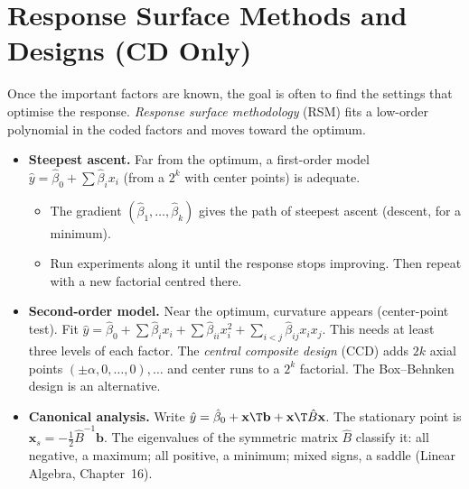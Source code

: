 \section{Response Surface Methods and Designs (CD Only)}

Once the important factors are known, the goal is often to find the settings that optimise the response. \emph{Response surface methodology} (RSM) fits a low-order polynomial in the coded factors and moves toward the optimum.

\begin{itemize}
  \item \textbf{Steepest ascent.} Far from the optimum, a first-order model $\hat{y}=\hat\beta_0+\sum\hat\beta_ix_i$ (from a $2^k$ with center points) is adequate.
  \begin{itemize}
    \item The gradient $(\hat\beta_1,\dots,\hat\beta_k)$ gives the path of steepest ascent (descent, for a minimum).
    \item Run experiments along it until the response stops improving. Then repeat with a new factorial centred there.
  \end{itemize}
  \item \textbf{Second-order model.} Near the optimum, curvature appears (center-point test). Fit $\hat{y}=\hat\beta_0+\sum\hat\beta_ix_i+\sum\hat\beta_{ii}x_i^2+\sum_{i<j}\hat\beta_{ij}x_ix_j$. This needs at least three levels of each factor. The \emph{central composite design} (CCD) adds $2k$ axial points $(\pm\alpha,0,\dots,0),\dots$ and center runs to a $2^k$ factorial. The Box--Behnken design is an alternative.
  \item \textbf{Canonical analysis.} Write $\hat{y}=\hat\beta_0+\mathbf{x}\T\mathbf{b}+\mathbf{x}\T\hat{B}\mathbf{x}$. The stationary point is $\mathbf{x}_s=-\tfrac12\hat{B}^{-1}\mathbf{b}$. The eigenvalues of the symmetric matrix $\hat{B}$ classify it: all negative, a maximum; all positive, a minimum; mixed signs, a saddle (Linear Algebra, Chapter~16).
\end{itemize}

